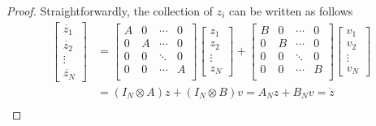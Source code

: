 \documentclass[11pt, a4paper, oneside, openany, reqno]{book}
\theoremstyle{definition}
\theoremstyle{remark}
\numberwithin{equation}{chapter} %
\begin{document}
\begin{proof}
	Straightforwardly, the collection of $ z_i $ can be written as follows
	\begin{equation}\begin{split}
	\left[ \begin{array}{c} \dot{z_1} \\ \dot{z_2} \\  \vdots \\ \dot{z_N} \end{array}  \right] &=
	\left[ \begin{array}{cccc} A & 0 & \cdots & 0\\
	0 & A & \cdots & 0 \\
	0 & 0 & \ddots & 0 \\
	0 & 0 & \cdots & A \\
	  \end{array} \right]
	\left[ \begin{array}{c} z_1 \\ z_2 \\  \vdots \\ z_N \end{array}  \right] 
	+
	\left[ \begin{array}{cccc} B & 0 & \cdots & 0\\
	0 & B & \cdots & 0 \\
	0 & 0 & \ddots & 0 \\
	0 & 0 & \cdots & B \\
	  \end{array} \right]
	\left[ \begin{array}{c} v_1 \\ v_2 \\  \vdots \\ v_N \end{array}  \right]  \\
	&= (I_N \otimes A) z + (I_N \otimes B) v= A_N z + B_N v =\dot{z}  \\
	\end{split}\end{equation}


\end{proof}
\end{document}

